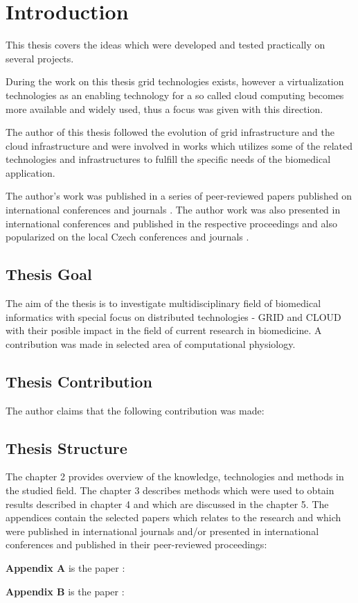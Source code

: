 \chapter{Introduction}
This thesis covers the ideas which were developed and tested practically on several projects. 

During the work on this thesis grid technologies exists, however a virtualization technologies as an enabling technology for a so called cloud computing becomes more available and widely used, thus a focus was given with this direction. 

The author of this thesis followed the evolution of grid infrastructure and the cloud infrastructure and were involved in works which utilizes some of the related technologies and infrastructures to fulfill the specific needs of the biomedical application.

The author's work was published in a series of peer-reviewed papers published on international conferences and journals \cite{kulhanek2009processing,kulhanekinfrastructure}.
The author work was also presented in international conferences and published in the respective proceedings
\cite{kulhanekod,kulhanekvirtualizace}
 and also popularized on the local Czech conferences and journals \cite{kulhanek2010remote,matejakmodel}.
\section{Thesis Goal}
The aim of the thesis is to investigate multidisciplinary field of biomedical informatics with special focus on distributed technologies - GRID and CLOUD with their posible impact in the field of current research in biomedicine. A contribution was made in selected area of computational physiology.

\section{Thesis Contribution}
The author claims that the following contribution was made:
\section{Thesis Structure}
The chapter 2 provides overview of the knowledge, technologies and methods in the studied field. The chapter 3 describes methods which were used to obtain results described in chapter 4 and which are discussed in the chapter 5.
The appendices contain the selected papers \cite{kulhanek2009processing,kulhanekinfrastructure} which relates to the research and which were published in international journals and/or presented in international conferences and published in their peer-reviewed proceedings:

\textbf{Appendix A} is the paper \cite{kulhanek2009processing}: 

\textbf{Appendix B} is the paper \cite{kulhanekinfrastructure}:
